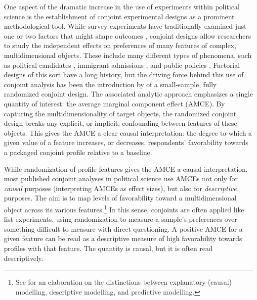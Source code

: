\documentclass[a4paper,12pt]{article}\usepackage[]{graphicx}\usepackage[]{color}
\begin{document}
One aspect of the dramatic increase in the use of experiments within political science \citep{Druckmanetal2006, Mutz2011} is the establishment of conjoint experimental designs as a prominent methodological tool. While survey experiments have traditionally examined just one or two factors that might shape outcomes \citep[see, for reviews,][]{GainesKuklinskiQuirk2007, Sniderman2011}, conjoint designs allow researchers to study the independent effects on preferences of many features of complex, multidimensional objects. These include many different types of phenomena, such as political candidates \citep{Campbelletal2016, TeeleKallaRosenbluth2018}, immigrant admissions \citep{HainmuellerHopkins2015, BansakHainmuellerHangartner2016, WrightLevyCitrin2016}, and public policies \citep{GallegoMarx2017, Hankinson2018}. Factorial designs of this sort have a long history, but the driving force behind this use of conjoint analysis has been the introduction by \citet{HainmuellerHopkinsYamamoto2014} of a small-sample, fully randomized conjoint design. The associated analytic approach emphasizes a single quantity of interest: the average marginal component effect (AMCE). By capturing the multidimensionality of target objects, the randomized conjoint design breaks any explicit, or implicit, confounding between features of these objects. This gives the AMCE a clear causal interpretation: the degree to which a given value of a feature increases, or decreases, respondents' favorability towards a packaged conjoint profile relative to a baseline. 

While randomization of profile features gives the AMCE a causal interpretation, most published conjoint analyses in political science use AMCEs not only for \textit{causal} purposes (interpreting AMCEs as effect sizes), but also for \textit{descriptive} purposes. The aim is to map levels of favorability toward a multidimensional object across its various features.\footnote{See \citet{Shmueli2010} for an elaboration on the distinctions between explanatory (causal) modelling, descriptive modelling, and predictive modelling.} In this sense, conjoints are often applied like list experiments, using randomization to measure a sample's preferences over something difficult to measure with direct questioning. A positive AMCE for a given feature can be read as a descriptive measure of high favorability towards profiles with that feature. The quantity is causal, but it is often read descriptively.
\end{document}
